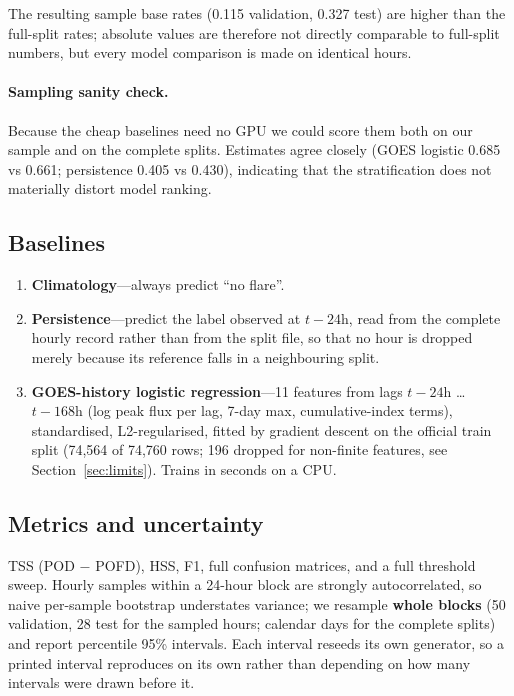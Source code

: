 \documentclass[11pt]{article}
\begin{document}
The resulting sample base rates (0.115 validation, 0.327 test) are higher than the
full-split rates; absolute values are therefore not directly comparable to
full-split numbers, but every model comparison is made on identical hours.

\paragraph{Sampling sanity check.} Because the cheap baselines need no GPU we
could score them both on our sample and on the complete splits. Estimates agree
closely (GOES logistic 0.685 vs 0.661; persistence 0.405 vs 0.430), indicating
that the stratification does not materially distort model ranking.

\subsection{Baselines}

\begin{enumerate}
\item \textbf{Climatology}---always predict ``no flare''.
\item \textbf{Persistence}---predict the label observed at $t-24$h, read from the
complete hourly record rather than from the split file, so that no hour is
dropped merely because its reference falls in a neighbouring split.
\item \textbf{GOES-history logistic regression}---11 features from lags $t-24$h
\ldots{} $t-168$h (log peak flux per lag, 7-day max, cumulative-index terms),
standardised, L2-regularised, fitted by gradient descent on the official train
split (74{,}564 of 74{,}760 rows; 196 dropped for non-finite features, see
Section~\ref{sec:limits}). Trains in seconds on a CPU.
\end{enumerate}

\subsection{Metrics and uncertainty}

TSS (POD $-$ POFD), HSS, F1, full confusion matrices, and a full threshold sweep.
Hourly samples within a 24-hour block are strongly autocorrelated, so naive
per-sample bootstrap understates variance; we resample \textbf{whole blocks} (50
validation, 28 test for the sampled hours; calendar days for the complete splits)
and report percentile 95\% intervals. Each interval reseeds its own generator, so
a printed interval reproduces on its own rather than depending on how many
intervals were drawn before it.
\end{document}
